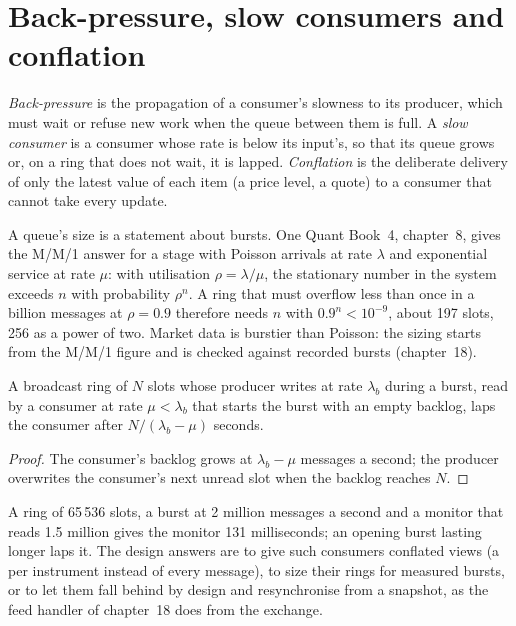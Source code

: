 \section{Back-pressure, slow consumers and conflation}

\begin{definition}\label{def:ll:queues-ring-buffers-and-shared-memory:bp}
\emph{Back-pressure} is the propagation of a consumer's slowness to its producer, which must wait or
refuse new work when the queue between them is full. A \emph{slow consumer} is a consumer whose rate is
below its input's, so that its queue grows or, on a ring that does not wait, it is lapped. \emph{Conflation}
is the deliberate delivery of only the latest value of each item (a price level, a quote) to a consumer that cannot take every
update.
\end{definition}

A queue's size is a statement about bursts. One Quant Book~4, chapter~8, gives the M/M/1 answer for a stage with Poisson
arrivals at rate $\lambda$ and exponential service at rate $\mu$: with utilisation $\rho = \lambda/\mu$, the stationary number
in the system exceeds $n$ with probability $\rho^n$. A ring that must overflow less than once in a billion messages at
$\rho = 0.9$ therefore needs $n$ with $0.9^n < 10^{-9}$, about 197 slots, 256 as a power of two. Market data is burstier than
Poisson: the sizing starts from the M/M/1 figure and is checked against recorded bursts (chapter~18).

\begin{proposition}\label{prop:ll:queues-ring-buffers-and-shared-memory:lap}
A broadcast ring of $N$ slots whose producer writes at rate $\lambda_b$ during a burst, read by a consumer at rate $\mu < \lambda_b$
that starts the burst with an empty backlog, laps the consumer after $N/(\lambda_b - \mu)$ seconds.
\end{proposition}

\begin{proof}
The consumer's backlog grows at $\lambda_b - \mu$ messages a second; the producer overwrites the consumer's next unread slot when
the backlog reaches $N$.
\end{proof}

A ring of 65\,536 slots, a burst at 2 million messages a second and a monitor that reads 1.5 million gives the monitor 131
milliseconds; an opening burst lasting longer laps it. The design answers are to give such consumers conflated views (a
 per instrument instead of every message), to size their rings for measured bursts, or to let them fall behind
by design and resynchronise from a snapshot, as the feed handler of chapter~18 does from the exchange.


